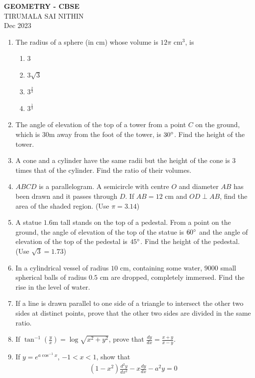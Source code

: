 \documentclass{article}
\newcommand{\brak}[1]{\ensuremath{\left(#1\right)}}
\begin{document}
\begin{center}
\textbf{GEOMETRY - CBSE}\\
TIRUMALA SAI NITHIN\\
Dec 2023
\end{center}

\begin{enumerate}

\item The radius of a sphere (in cm) whose volume is $12\pi \text{ cm}^3$, is
\begin{enumerate}
\item $3$
\item $3\sqrt{3}$
\item $3^{\frac{2}{3}}$
\item $3^{\frac{1}{3}}$
\end{enumerate}

\item The angle of elevation of the top of a tower from a point $C$ on the
ground, which is $30\text{m}$ away from the foot of the tower, is $30\degree$.
Find the height of the tower.

\item A cone and a cylinder have the same radii but the height of the cone is
$3$ times that of the cylinder. Find the ratio of their volumes.

\item $ABCD$ is a parallelogram. A semicircle with centre $O$ and diameter $AB$
has been drawn and it passes through $D$. If $AB = 12\text{ cm}$ and
$OD \perp AB$, find the area of the shaded region. (Use $\pi = 3.14$)

\item A statue $1.6\text{m}$ tall stands on the top of a pedestal. From a point
on the ground, the angle of elevation of the top of the statue is $60\degree$
and the angle of elevation of the top of the pedestal is $45\degree$.
Find the height of the pedestal. (Use $\sqrt{3} = 1.73$)

\item In a cylindrical vessel of radius $10\text{ cm}$, containing some water,
$9000$ small spherical balls of radius $0.5\text{ cm}$ are dropped, completely
immersed. Find the rise in the level of water.

\item If a line is drawn parallel to one side of a triangle to intersect the
other two sides at distinct points, prove that the other two sides are divided
in the same ratio.

\item If $\tan^{-1}\brak{\frac{y}{x}} = \log\sqrt{x^2 + y^2}$, prove that
$\frac{dy}{dx} = \frac{x+y}{x-y}$.

\item If $y = e^{a\cos^{-1}x}$, $-1 < x < 1$, show that
\begin{align}
\brak{1-x^2}\frac{d^2y}{dx^2} - x\frac{dy}{dx} - a^2 y = 0
\end{align}

\end{enumerate}
\end{document}
